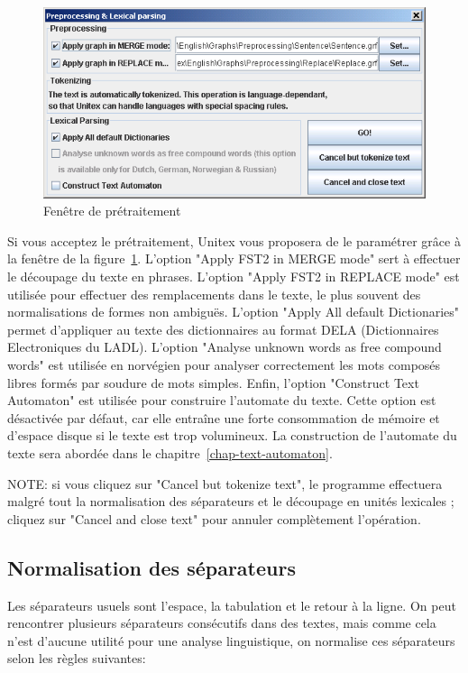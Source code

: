 \begin{figure}[!ht]
\begin{center}
\includegraphics[width=15cm]{resources/img/fig2-9.png}
\caption{Fenêtre de prétraitement\label{fig-preprocessing-frame}}
\end{center}
\end{figure}

\bigskip
\noindent 
Si vous acceptez le prétraitement, Unitex vous proposera de le paramétrer grâce à la fenêtre de la
figure~\ref{fig-preprocessing-frame}. L’option "Apply FST2 in MERGE mode" sert à effectuer le
découpage du texte en phrases. L’option "Apply FST2 in REPLACE mode" est utilisée pour effectuer des
remplacements dans le texte, le plus souvent des normalisations de formes non ambiguës. L’option
"Apply All default Dictionaries" permet d’appliquer au texte des dictionnaires au format DELA
(Dictionnaires Electroniques du LADL).  L’option "Analyse unknown words as free 
compound words" est utilisée en norvégien pour analyser correctement les mots composés libres
formés par soudure de mots simples. Enfin, l’option "Construct Text Automaton" est utilisée
pour construire l’automate du texte. Cette option est désactivée par défaut, car elle entraîne
une forte consommation de mémoire et d’espace disque si le texte est trop volumineux. La
construction de l’automate du texte sera abordée dans le chapitre~\ref{chap-text-automaton}.

\bigskip
\noindent NOTE: si vous cliquez sur "Cancel but tokenize text", le programme effectuera malgré
tout la normalisation des séparateurs et le découpage en unités lexicales ; cliquez sur "Cancel
and close text" pour annuler complètement l’opération.


\subsection{Normalisation des séparateurs}
Les séparateurs usuels sont l’espace, la tabulation et le retour à la ligne. On peut rencontrer
plusieurs séparateurs consécutifs dans des textes, mais comme cela n’est d’aucune utilité
pour une analyse linguistique, on normalise ces séparateurs selon les règles suivantes:

